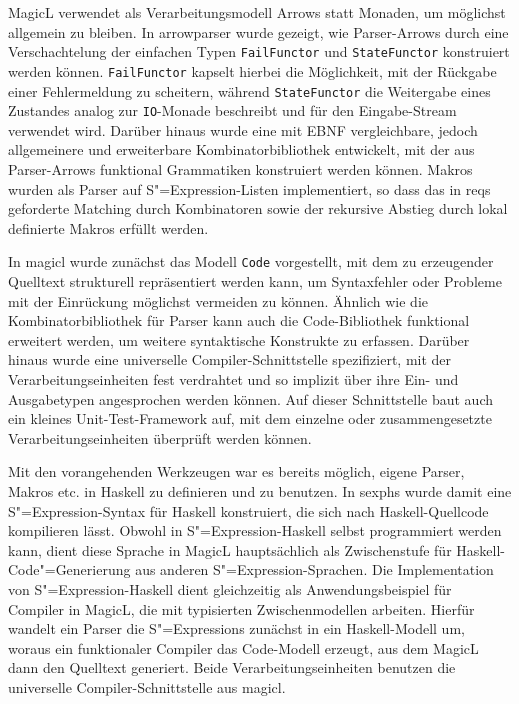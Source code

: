 \documentclass[12pt, a4paper, bibgerm]{scrbook}
\newcommand\icode[1]{\lstinline?#1?}
\newcommand\cref{}
\newcommand{\sexp}{S"=Expression}
\newcommand{\sexps}{S"=Expressions}
\newcommand{\cgen}{Code"=Generierung}
\begin{document}
MagicL verwendet als Verarbeitungsmodell Arrows statt Monaden, um
möglichst allgemein zu bleiben. In \cref{arrowparser} wurde gezeigt, wie
Parser-Arrows durch eine Verschachtelung der einfachen Typen
\icode{FailFunctor} und \icode{StateFunctor} konstruiert werden
können. \icode{FailFunctor} kapselt hierbei die Möglichkeit, mit der
Rückgabe einer Fehlermeldung zu scheitern, während \icode{StateFunctor}
die Weitergabe eines Zustandes analog zur \icode{IO}-Monade beschreibt
und für den Eingabe-Stream verwendet wird. Darüber hinaus wurde eine mit
EBNF vergleichbare, jedoch allgemeinere und erweiterbare
Kombinatorbibliothek entwickelt, mit der aus Parser-Arrows funktional
Grammatiken konstruiert werden können. Makros wurden als Parser auf
\sexp{}-Listen implementiert, so dass das in \cref{reqs} geforderte
Matching durch Kombinatoren sowie der rekursive Abstieg durch lokal
definierte Makros erfüllt werden.

In \cref{magicl} wurde zunächst das Modell \icode{Code} vorgestellt, mit
dem zu erzeugender Quelltext strukturell repräsentiert werden kann, um
Syntaxfehler oder Probleme mit der Einrückung möglichst vermeiden zu
können. Ähnlich wie die Kombinatorbibliothek für Parser kann auch die
Code-Bibliothek funktional erweitert werden, um weitere syntaktische
Konstrukte zu erfassen. Darüber hinaus wurde eine universelle
Compiler-Schnittstelle spezifiziert, mit der Verarbeitungseinheiten fest
verdrahtet und so implizit über ihre Ein- und Ausgabetypen angesprochen
werden können. Auf dieser Schnittstelle baut auch ein kleines
Unit-Test-Framework auf, mit dem einzelne oder zusammengesetzte
Verarbeitungseinheiten überprüft werden können.

Mit den vorangehenden Werkzeugen war es bereits möglich, eigene Parser,
Makros etc. in Haskell zu definieren und zu benutzen. In \cref{sexphs}
wurde damit eine \sexp{}-Syntax für Haskell konstruiert, die sich nach
Haskell-Quellcode kompilieren lässt. Obwohl in \sexp{}-Haskell selbst
programmiert werden kann, dient diese Sprache in MagicL hauptsächlich
als Zwischenstufe für Haskell-\cgen{} aus anderen \sexp{}-Sprachen. Die
Implementation von \sexp{}-Haskell dient gleichzeitig als
Anwendungsbeispiel für Compiler in MagicL, die mit typisierten
Zwischenmodellen arbeiten. Hierfür wandelt ein Parser die \sexps{}
zunächst in ein Haskell-Modell um, woraus ein funktionaler Compiler das
Code-Modell erzeugt, aus dem MagicL dann den Quelltext generiert. Beide
Verarbeitungseinheiten benutzen die universelle Compiler-Schnittstelle
aus \cref{magicl}.
\end{document}
